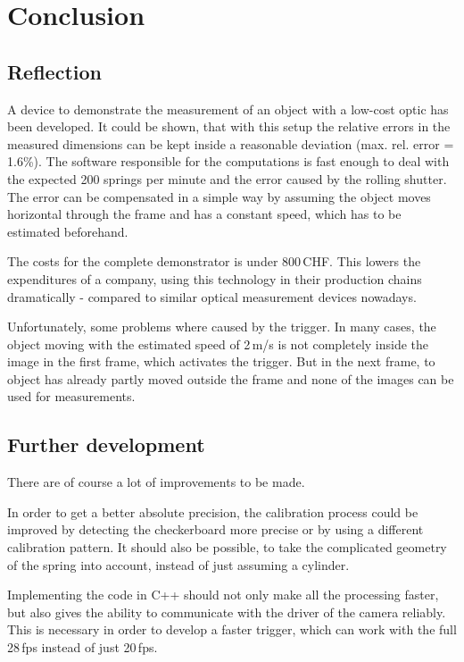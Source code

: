 \chapter{Conclusion}

\section{Reflection}
A device to demonstrate the measurement of an object with a low-cost optic has been developed.
It could be shown, that with this setup the relative errors in the measured dimensions can be kept inside a reasonable deviation (max. rel. error = 1.6\%).
The software responsible for the computations is fast enough to deal with the expected 200 springs per minute and the error caused by the rolling shutter.
The error can be compensated in a simple way by assuming the object moves horizontal through the frame and has a constant speed, which has to be estimated beforehand.

The costs for the complete demonstrator is under 800\,CHF.
This lowers the expenditures of a company, using this technology in their production chains dramatically - compared to similar optical measurement devices nowadays.

Unfortunately, some problems where caused by the trigger.
In many cases, the object moving with the estimated speed of 2\,m/s is not completely inside the image in the first frame, which activates the trigger.
But in the next frame, to object has already partly moved outside the frame and none of the images can be used for measurements.

\section{Further development}
There are of course a lot of improvements to be made.

In order to get a better absolute precision, the calibration process could be improved by detecting the checkerboard more precise or by using a different calibration pattern.
It should also be possible, to take the complicated geometry of the spring into account, instead of just assuming a cylinder.

Implementing the code in C++ should not only make all the processing faster, but also gives the ability to communicate with the driver of the camera reliably.
This is necessary in order to develop a faster trigger, which can work with the full 28\,fps instead of just 20\,fps.


